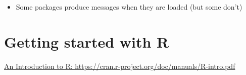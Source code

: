 \documentclass[
]{book}
\providecommand{\tightlist}{%
  \setlength{\itemsep}{0pt}\setlength{\parskip}{0pt}}
\begin{document}
\begin{itemize}
\tightlist
\item
  Some packages produce messages when they are loaded (but some don't)
\end{itemize}

\hypertarget{getting-started-with-r-1}{%
\section{Getting started with R}\label{getting-started-with-r-1}}

\href{https://cran.r-project.org/doc/manuals/R-intro.pdf}{An Introduction to R: https://cran.r-project.org/doc/manuals/R-intro.pdf}

  
\end{document}
